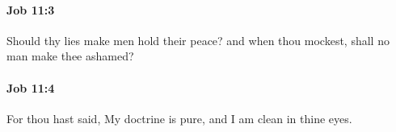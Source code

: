 		\paragraph{Job 11:3} %
			\label{JOB-11-3}

			Should thy lies make men hold their peace? and when thou mockest, shall no man make thee ashamed?


		\paragraph{Job 11:4} %
			\label{JOB-11-4}

			For thou hast said, My doctrine is pure, and I am clean in thine eyes.


